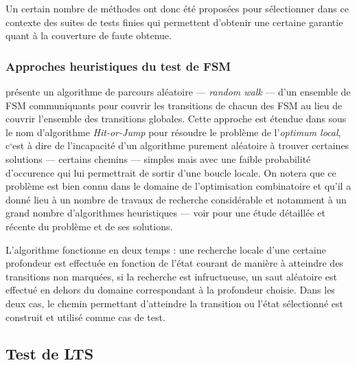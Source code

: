 Un certain nombre de m\'ethodes ont donc \'et\'e propos\'ees pour
s\'electionner dans ce contexte des suites de tests finies qui
permettent d'obtenir une certaine garantie quant \`a la couverture de
faute obtenue. 

\subsubsection{Approches heuristiques du test de \textsf{FSM}}
\label{sec:test-fsm-heuristic}

 \cite{lee-random-walk} pr\'esente un algorithme de
parcours al\'eatoire --- \emph{random walk} --- d'un ensemble  de \textsf{FSM}
communiquants pour couvrir les transitions de chacun des \textsf{FSM} au lieu
de couvrir l'ensemble des transitions globales. Cette approche est
\'etendue dans \cite{thzaidi} sous le nom d'algorithme
\emph{Hit-or-Jump} pour r\'esoudre le probl\`eme de l'\emph{optimum
  local}, c`est \`a dire de l'incapacit\'e d'un algorithme purement
al\'eatoire \`a trouver certaines solutions --- certains chemins ---
simples mais avec une faible probabilit\'e d'occurence qui lui
permettrait de sortir d'une boucle locale. On notera que ce
probl\`eme est bien connu dans le domaine de l'optimisation
combinatoire et qu'il a donn\'e lieu \`a un nombre de travaux de
recherche consid\'erable et notamment \`a un grand nombre
d'algorithmes heuristiques --- voir \cite{modern-heuristics} pour une
\'etude d\'etaill\'ee et r\'ecente du probl\`eme et de ses
solutions.

L'algorithme fonctionne en deux temps : une recherche locale d'une
certaine profondeur est effectu\'ee en fonction de l'\'etat courant
de mani\`ere \`a atteindre des transitions non marqu\'ees, si la
recherche est infructueuse, un saut al\'eatoire est effectu\'e  en
dehors du domaine correspondant \`a la profondeur 
choisie. Dans les deux cas, le chemin permettant d'atteindre la
transition ou l'\'etat s\'electionn\'e est construit et utilis\'e
comme cas de test.

\subsection{Test de LTS}
\label{sec:test-de-lts}


